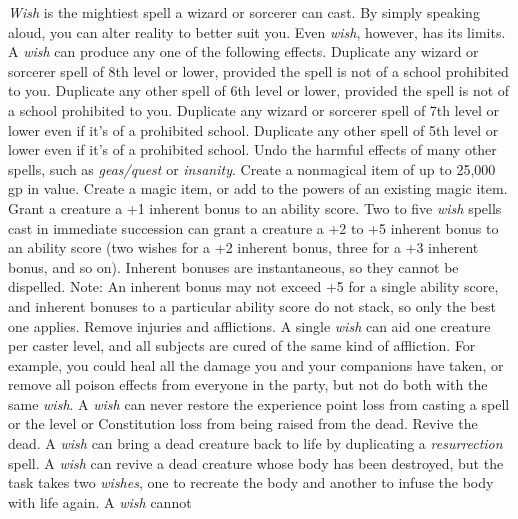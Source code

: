 \textit{Wish} is the mightiest spell a wizard or sorcerer can cast. By simply speaking
aloud, you can alter reality to better suit you.
Even \textit{wish}, however, has its limits.
A \textit{wish} can produce any one of the following effects.%
Duplicate any wizard or sorcerer spell of 8th level or lower, provided the spell
is not of a school prohibited to you.%
Duplicate any other spell of 6th level or lower, provided the spell is not of a
school prohibited to you.%
Duplicate any wizard or sorcerer spell of 7th level or lower even if it's of a
prohibited school.%
Duplicate any other spell of 5th level or lower even if it's of a prohibited school.
Undo the harmful effects of many other spells, such as \textit{geas/quest} or \textit{insanity}.%
Create a nonmagical item of up to 25,000 gp in value.%
Create a magic item, or add to the powers of an existing magic item.%
Grant a creature a +1 inherent bonus to an ability score. Two to five \textit{wish
}spells cast in immediate succession can grant a creature a +2 to +5 inherent bonus
to an ability score (two wishes for a +2 inherent bonus, three for a +3 inherent
bonus, and so on). Inherent bonuses are instantaneous, so they cannot be dispelled.
Note: An inherent bonus may not exceed +5 for a single ability score,
and inherent bonuses to a particular ability score do not stack, so only the best
one applies.%
Remove injuries and afflictions. A single \textit{wish} can aid one creature per
caster level, and all subjects are cured of the same kind of affliction. For example,
you could heal all the damage you and your companions have taken, or remove all
poison effects from everyone in the party, but not do both with the same \textit{wish}.
A \textit{wish} can never restore the experience point loss from casting a spell
or the level or Constitution loss from being raised from the dead.%
Revive the dead. A \textit{wish} can bring a dead creature back to life by duplicating
a \textit{resurrection} spell. A \textit{wish} can revive a dead creature whose
body has been destroyed, but the task takes two \textit{wishes}, one to recreate
the body and another to infuse the body with life again. A \textit{wish} cannot
